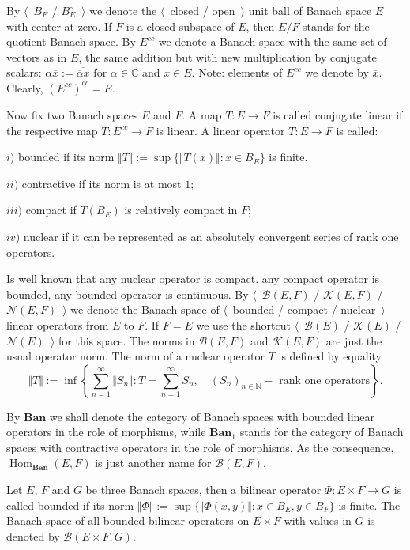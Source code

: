 By $\langle$~$B_E$ / $B_E^\circ$~$\rangle$ we denote the $\langle$~closed / open~$\rangle$ unit ball of Banach space $E$ with center at zero. If $F$ is a closed subspace of $E$, then $E/F$ stands for the quotient Banach space. By $E^{cc}$ we denote a Banach space with the same set of vectors as in $E$, the same addition but with new multiplication by conjugate scalars:  $\alpha \overline{x}:=\overline{\overline{\alpha}x}$ for $\alpha\in\mathbb{C}$ and $x\in E$. Note: elements of $E^{cc}$ we denote by $\overline{x}$. Clearly, $(E^{cc})^{cc}=E$.

Now fix two Banach spaces $E$ and $F$. A map $T:E\to F$ is called conjugate linear if the respective map $T:E^{cc}\to F$ is linear. A linear operator $T:E\to F$ is called:

$i)$ bounded if its norm $\Vert T\Vert:=\sup\{\Vert T(x)\Vert:x\in B_E\}$ is finite.

$ii)$ contractive if its norm is at most $1$;

$iii)$ compact if $T(B_E)$ is relatively compact in $F$;

$iv)$ nuclear if it can be represented as an absolutely convergent series of rank one operators.

Is well known that any nuclear operator is compact. any compact operator is bounded, any bounded operator is continuous. By $\langle$~$\mathcal{B}(E,F)$ / $\mathcal{K}(E,F)$ / $\mathcal{N}(E,F)$~$\rangle$ we denote the Banach space of $\langle$~bounded / compact / nuclear~$\rangle$ linear operators from $E$ to $F$. If $F=E$ we use the shortcut $\langle$~$\mathcal{B}(E)$ / $\mathcal{K}(E)$ / $\mathcal{N}(E)$~$\rangle$ for this space. The norms in $\mathcal{B}(E,F)$ and $\mathcal{K}(E,F)$ are just the usual operator norm. The norm of a nuclear operator $T$ is defined by equality
$$
\Vert T\Vert:=\inf\left\{\sum_{n=1}^\infty\Vert S_n\Vert: T=\sum_{n=1}^\infty S_n,\quad (S_n)_{n\in\mathbb{N}} - \mbox{ rank one operators}\right\}.
$$

By $\mathbf{Ban}$ we shall denote the category of Banach spaces with bounded linear operators in the role of morphisms, while $\mathbf{Ban}_1$ stands for the category of Banach spaces with contractive operators in the role of morphisms. As the consequence, $\operatorname{Hom}_{\mathbf{Ban}}(E,F)$ is just another name for $\mathcal{B}(E,F)$.

Let $E$, $F$ and $G$ be three Banach spaces, then a bilinear operator $\Phi:E\times F\to G$ is called bounded if its norm $\Vert \Phi\Vert:=\sup\{\Vert \Phi(x,y)\Vert:x\in B_E, y\in B_F\}$ is finite. The Banach space of all bounded bilinear operators on $E\times F$ with values in $G$ is denoted by $\mathcal{B}(E\times F,G)$.

